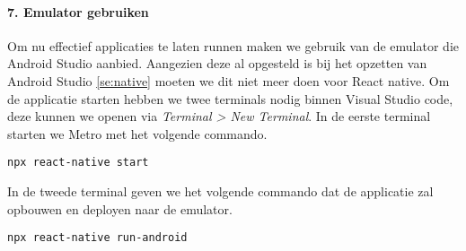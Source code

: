 \paragraph{7. Emulator gebruiken} \label{par:emulatorgebruiken}
Om nu effectief applicaties te laten runnen maken we gebruik van de emulator die Android Studio aanbied. 
Aangezien deze al opgesteld is bij het opzetten van Android Studio \ref{se:native} 
moeten we dit niet meer doen voor React native. Om de applicatie starten hebben we twee terminals nodig 
binnen Visual Studio code, deze kunnen we openen via \textit{Terminal > New Terminal}. 
In de eerste terminal starten we \gls{Metro} met het volgende commando.
\begin{verbatim}
npx react-native start
\end{verbatim}
In de tweede terminal geven we het volgende commando dat de applicatie zal opbouwen en 
deployen naar de emulator.
\begin{verbatim}
npx react-native run-android
\end{verbatim}